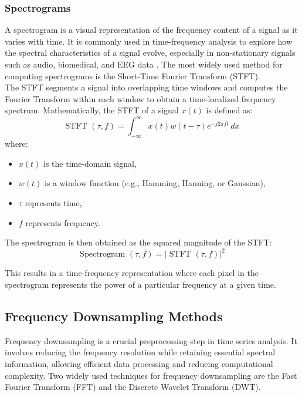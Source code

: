 \subsubsection*{Spectrograms}

A spectrogram is a visual representation of the frequency content of a signal as it varies with time. It is commonly used in time-frequency analysis to explore how the spectral characteristics of a signal evolve, especially in non-stationary signals such as audio, biomedical, and EEG data \parencite{welch2003use}. The most widely used method for computing spectrograms is the Short-Time Fourier Transform (STFT). \\

The STFT segments a signal into overlapping time windows and computes the Fourier Transform within each window to obtain a time-localized frequency spectrum. Mathematically, the STFT of a signal $x(t)$ is defined as:
\begin{equation}
    \text{STFT }(\tau, f) = \int_{-\infty}^{\infty} x(t)w(t-\tau)e^{-j2\pi ft} \,dx 
\end{equation}
where:
\begin{itemize}
    \item $x(t)$ is the time-domain signal,
    \item $w(t)$ is a window function (e.g., Hamming, Hanning, or Gaussian),
    \item $\tau$ represents time,
    \item $f$ represents frequency.
\end{itemize}

The spectrogram is then obtained as the squared magnitude of the STFT:
\begin{equation}
    \text{Spectrogram }(\tau, f) =  \lvert \text{ STFT }(\tau , f) \rvert ^{2}
\end{equation}

 This results in a time-frequency representation where each pixel in the spectrogram represents the power of a particular frequency at a given time.


\subsection{Frequency Downsampling Methods}

Frequency downsampling is a crucial preprocessing step in time series analysis. It involves reducing the frequency resolution while retaining essential spectral information, allowing efficient data processing and reducing computational complexity. Two widely used techniques for frequency downsampling are the Fast Fourier Transform (FFT) and the Discrete Wavelet Transform (DWT). \\

